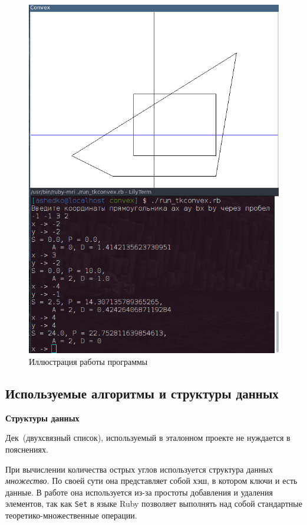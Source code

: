 \begin{figure}[ht!]
\begin{center}
\includegraphics[scale=0.6]{images/convex_ill}
\end{center}
\vspace*{-8mm}
\caption{Иллюстрация работы программы}\label{fig:conv_ill}
\end{figure}

\newpage
\subsection{Используемые алгоритмы и структуры данных}

\textbf{Структуры данных}

Дек~(двухсвязный список), используемый в эталонном проекте не нуждается в пояснениях.

При вычислении количества острых углов используется структура данных \emph{множество}. По своей сути она представляет собой хэш, в котором ключи и есть данные. В работе она используется из-за простоты добавления и удаления элементов, так как \verb|Set| в языке Ruby позволяет выполнять над собой стандартные теоретико-множественные операции.

